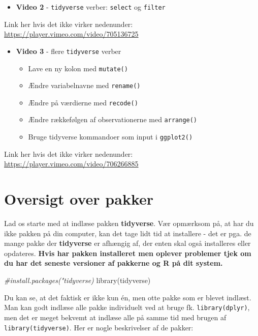 \documentclass[
]{book}
\newenvironment{Shaded}{\begin{snugshade}}{\end{snugshade}}
\newcommand{\CommentTok}[1]{\textcolor[rgb]{0.56,0.35,0.01}{\textit{#1}}}
\newcommand{\FunctionTok}[1]{\textcolor[rgb]{0.00,0.00,0.00}{#1}}
\newcommand{\NormalTok}[1]{#1}
\providecommand{\tightlist}{%
  \setlength{\itemsep}{0pt}\setlength{\parskip}{0pt}}
\begin{document}
\begin{itemize}
\tightlist
\item
  \textbf{Video 2} - \texttt{tidyverse} verber: \texttt{select} og \texttt{filter}
\end{itemize}

Link her hvis det ikke virker nedenunder: \url{https://player.vimeo.com/video/705136725}

\begin{itemize}
\tightlist
\item
  \textbf{Video 3} - flere \texttt{tidyverse} verber

  \begin{itemize}
  \tightlist
  \item
    Lave en ny kolon med \texttt{mutate()}
  \item
    Ændre variabelnavne med \texttt{rename()}
  \item
    Ændre på værdierne med \texttt{recode()}
  \item
    Ændre rækkefølgen af observationerne med \texttt{arrange()}
  \item
    Bruge tidyverse kommandoer som input i \texttt{ggplot2()}
  \end{itemize}
\end{itemize}

Link her hvis det ikke virker nedenunder: \url{https://player.vimeo.com/video/706266885}

\hypertarget{oversigt-over-pakker}{%
\section{Oversigt over pakker}\label{oversigt-over-pakker}}

Lad os starte med at indlæse pakken \textbf{tidyverse}. Vær opmærksom på, at har du ikke pakken på din computer, kan det tage lidt tid at installere - det er pga. de mange pakke der \textbf{tidyverse} er afhængig af, der enten skal også installeres eller opdateres. \textbf{Hvis har pakken installeret men oplever problemer tjek om du har det seneste versioner af pakkerne og R på dit system.}

\begin{Shaded}
\begin{Highlighting}[]
\CommentTok{\#install.packages("tidyverse)}
\FunctionTok{library}\NormalTok{(tidyverse)}
\end{Highlighting}
\end{Shaded}

Du kan se, at det faktisk er ikke kun én, men otte pakke som er blevet indlæst. Man kan godt indlæse alle pakke individuelt ved at bruge fk. \texttt{library(dplyr)}, men det er meget bekvemt at indlæse alle på samme tid med brugen af \texttt{library(tidyverse)}. Her er nogle beskrivelser af de pakker:
\end{document}

